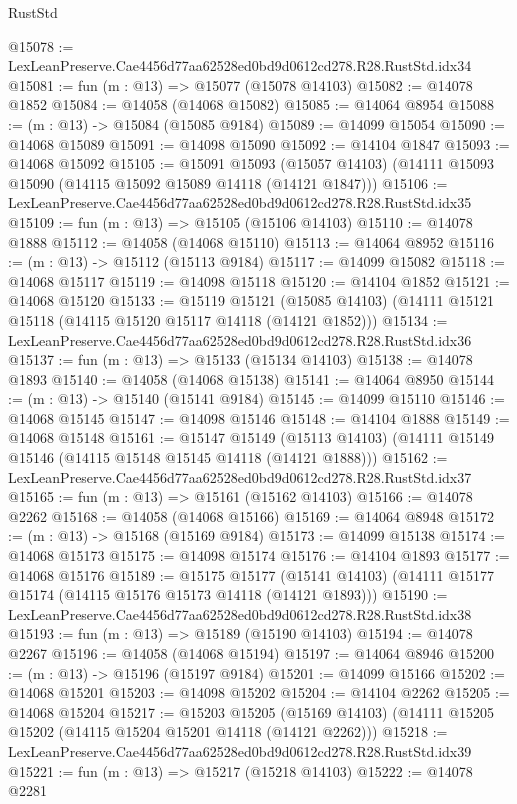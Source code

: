 \begin{lexlean}{RustStd}
\begin{coremodule}
@15078 := LexLeanPreserve.Cae4456d77aa62528ed0bd9d0612cd278.R28.RustStd.idx34
@15081 := fun (m : @13) => @15077 (@15078 @14103)
@15082 := @14078 @1852
@15084 := @14058 (@14068 @15082)
@15085 := @14064 @8954
@15088 := (m : @13) -> @15084 (@15085 @9184)
@15089 := @14099 @15054
@15090 := @14068 @15089
@15091 := @14098 @15090
@15092 := @14104 @1847
@15093 := @14068 @15092
@15105 := @15091
    @15093
    (@15057 @14103)
    (@14111 @15093 @15090 (@14115 @15092 @15089 @14118 (@14121 @1847)))
@15106 := LexLeanPreserve.Cae4456d77aa62528ed0bd9d0612cd278.R28.RustStd.idx35
@15109 := fun (m : @13) => @15105 (@15106 @14103)
@15110 := @14078 @1888
@15112 := @14058 (@14068 @15110)
@15113 := @14064 @8952
@15116 := (m : @13) -> @15112 (@15113 @9184)
@15117 := @14099 @15082
@15118 := @14068 @15117
@15119 := @14098 @15118
@15120 := @14104 @1852
@15121 := @14068 @15120
@15133 := @15119
    @15121
    (@15085 @14103)
    (@14111 @15121 @15118 (@14115 @15120 @15117 @14118 (@14121 @1852)))
@15134 := LexLeanPreserve.Cae4456d77aa62528ed0bd9d0612cd278.R28.RustStd.idx36
@15137 := fun (m : @13) => @15133 (@15134 @14103)
@15138 := @14078 @1893
@15140 := @14058 (@14068 @15138)
@15141 := @14064 @8950
@15144 := (m : @13) -> @15140 (@15141 @9184)
@15145 := @14099 @15110
@15146 := @14068 @15145
@15147 := @14098 @15146
@15148 := @14104 @1888
@15149 := @14068 @15148
@15161 := @15147
    @15149
    (@15113 @14103)
    (@14111 @15149 @15146 (@14115 @15148 @15145 @14118 (@14121 @1888)))
@15162 := LexLeanPreserve.Cae4456d77aa62528ed0bd9d0612cd278.R28.RustStd.idx37
@15165 := fun (m : @13) => @15161 (@15162 @14103)
@15166 := @14078 @2262
@15168 := @14058 (@14068 @15166)
@15169 := @14064 @8948
@15172 := (m : @13) -> @15168 (@15169 @9184)
@15173 := @14099 @15138
@15174 := @14068 @15173
@15175 := @14098 @15174
@15176 := @14104 @1893
@15177 := @14068 @15176
@15189 := @15175
    @15177
    (@15141 @14103)
    (@14111 @15177 @15174 (@14115 @15176 @15173 @14118 (@14121 @1893)))
@15190 := LexLeanPreserve.Cae4456d77aa62528ed0bd9d0612cd278.R28.RustStd.idx38
@15193 := fun (m : @13) => @15189 (@15190 @14103)
@15194 := @14078 @2267
@15196 := @14058 (@14068 @15194)
@15197 := @14064 @8946
@15200 := (m : @13) -> @15196 (@15197 @9184)
@15201 := @14099 @15166
@15202 := @14068 @15201
@15203 := @14098 @15202
@15204 := @14104 @2262
@15205 := @14068 @15204
@15217 := @15203
    @15205
    (@15169 @14103)
    (@14111 @15205 @15202 (@14115 @15204 @15201 @14118 (@14121 @2262)))
@15218 := LexLeanPreserve.Cae4456d77aa62528ed0bd9d0612cd278.R28.RustStd.idx39
@15221 := fun (m : @13) => @15217 (@15218 @14103)
@15222 := @14078 @2281

\end{coremodule}
\end{lexlean}
